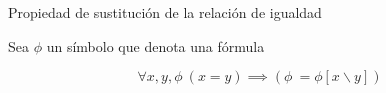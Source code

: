 \begin{axiom} \label{eq_subs} Propiedad de sustitución de la relación de igualdad
\begin{center}
	Sea $\phi$ un símbolo que denota una fórmula
\end{center}
	\begin{equation}
		\forall x,y,\phi\ (x=y) \implies (\phi\ = \phi[x \backslash y])
	\end{equation}
\end{axiom}
